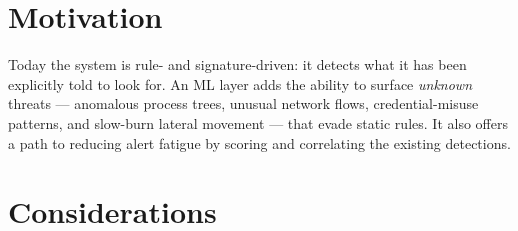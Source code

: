 \documentclass[11pt,a4paper]{report}
\begin{document}
\section{Motivation}

Today the system is rule- and signature-driven: it detects what it has been
explicitly told to look for. An ML layer adds the ability to surface
\emph{unknown} threats — anomalous process trees, unusual network flows,
credential-misuse patterns, and slow-burn lateral movement — that evade static
rules. It also offers a path to reducing alert fatigue by scoring and correlating
the existing detections.




\section{Considerations}
\end{document}

